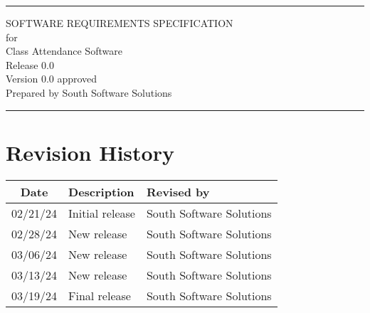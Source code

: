 \documentclass[letterpaper,12pt,oneside,listof=totoc]{scrreprt}
\date{\today}
\author{} %
\def\myversion{0.0 }
\begin{document}
\begin{titlepage}
\flushright
\rule{\textwidth}{5pt}\vskip1cm
\Huge{SOFTWARE REQUIREMENTS SPECIFICATION}\\
\vspace{1.5cm}
for\\
\vspace{1.5cm}
Class Attendance Software\\                      %
\vspace{1.5cm}
\LARGE{Release 0.0\\}
\vspace{1.5cm}
\LARGE{Version \myversion approved\\}
\vspace{1.5cm}
Prepared by South Software Solutions\\
\vfill
\rule{\textwidth}{5pt}
\end{titlepage}

\tableofcontents

\listoffigures

\listoftables

\chapter*{Revision History}

\begin{tabular}{| c | p{} | p{} |}
\hline
Date     & Description   & Revised by \\
\hline
02/21/24 & Initial release & South Software Solutions \\
\hline
02/28/24 & New release & South Software Solutions \\
\hline
03/06/24 & New release & South Software Solutions \\
\hline
03/13/24 & New release & South Software Solutions \\
\hline
03/19/24 & Final release & South Software Solutions \\
\hline
\end{tabular}
\end{document}
